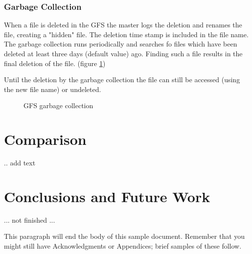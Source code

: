 \documentclass{sig-alternate}
\begin{document}
\subsubsection{Garbage Collection}
\label{gfs_gc}
When a file is deleted in the GFS the master logs the deletion and renames the file, creating a "hidden" file. The deletion time stamp is included in the file name. The garbage collection runs periodically and searches fo files which have been deleted at least three days (default value) ago. Finding such a file results in the final deletion of the file. (figure \ref{fig:gfs_gc})

Until the deletion by the garbage collection the file can still be accessed (using the new file name) or undeleted.

\begin{figure}[!hbt]
\centering
{}
\caption{GFS garbage collection}
\label{fig:gfs_gc}
\end{figure}

\section{Comparison}
.. add text

\section{Conclusions and Future Work}
... not finished ...

This paragraph will end the body of this sample document.
Remember that you might still have Acknowledgments or
Appendices; brief samples of these
follow.




%

\end{document}
